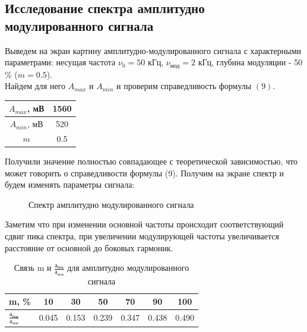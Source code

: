 \documentclass[a4paper, 12pt]{article}%
\begin{document}
 	\subsection{Исследование спектра амплитудно модулированного сигнала}
 	Выведем на экран картину амплитудно-модулированного сигнала с характерными параметрами: несущая частота $\nu_0 = 50$ кГц, $\nu_{\text{мод}} = 2$ кГц, глубина модуляции - 50 \% ($m = 0.5$).\\
 	Найдем для него $A_{max}$ и $A_{min}$ и проверим справедливость формулы $(9)$.
 	\begin{center}
 		\begin{tabular}{|c|c|}
 			\hline
 			$A_{max}$, мВ & 1560 \\ \hline
 			$A_{min}$, мВ & 520 \\ \hline
 			$m$ & 0.5 \\ \hline
 		\end{tabular}
 	\end{center}
 	Получили значение полностью совпадающее с теоретической зависимостью, что может говорить о справедливости формулы (9).
 	Получим на экране спектр и будем изменять параметры сигнала:
 	\begin{figure}[H]
 		\centering
 		\qquad
 		    		\caption{Спектр амплитудно модулированного сигнала}	
 	\end{figure}
 	Заметим что при изменении основной частоты происходит соответствующий сдвиг пика спектра, при увеличении модулирующей частоты увеличивается расстояние от основной до боковых гармоник.
 	\begin{table}[H]
 		\centering
 		\begin{tabular}{|l|c|c|c|c|c|c|}
 			\hline
 			m, \%     & 10    & 30    & 50    & 70    & 90    & 100   \\ \hline
 			$\frac{а_{бок}}{а_{осн}}$ & 0.045 & 0.153 & 0.239 & 0.347 & 0.438 & 0.490 \\ \hline
 		\end{tabular}
 		\caption{Связь m и $\frac{а_{бок}}{а_{осн}}$ для амплитудно модулированного сигнала}
 	\end{table}
\end{document}
